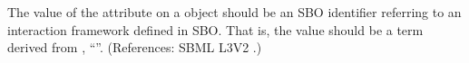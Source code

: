 The value of the attribute  on a \Model object should be an
SBO identifier referring to an interaction framework defined in SBO.  That
is, the value should be a term derived from \sbointeractionID,
``''.  (References: SBML L3V2 .)
